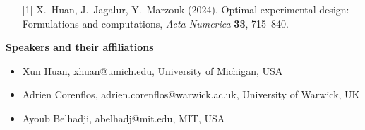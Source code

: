 \begin{talk}
\medskip

\begin{enumerate}
	\item[{[1]}] X.\ Huan, J.\ Jagalur, Y.\ Marzouk (2024). Optimal experimental design: Formulations and computations, \textit{Acta Numerica} \textbf{33}, 715--840.
\end{enumerate}


\textbf{Speakers and their affiliations}

\begin{itemize}
\item Xun Huan, xhuan@umich.edu, University of Michigan, USA
\item Adrien Corenflos, adrien.corenflos@warwick.ac.uk, University of Warwick, UK 
\item Ayoub Belhadji, abelhadj@mit.edu, MIT, USA
\end{itemize}

\end{talk}


